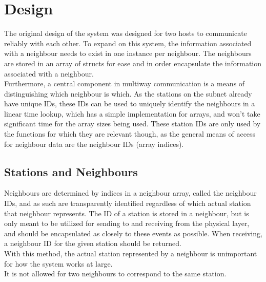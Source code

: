 \section{Design}


The original design of the system was designed for two hosts to communicate reliably with each other. To expand on this system, the information associated with a neighbour needs to exist in one instance per neighbour. The neighbours are stored in an array of structs for ease and in order encapsulate the information associated with a neighbour.\\
Furthermore, a central component in multiway communication is a means of distinguishing which neighbour is which. As the stations on the subnet already have unique IDs, these IDs can be used to uniquely identify the neighbours in a linear time lookup, which has a simple implementation for arrays, and won't take significant time for the array sizes being used. These station IDs are only used by the functions for which they are relevant though, as the general means of access for neighbour data are the neighbour IDs (array indices).

\subsection{Stations and Neighbours}
Neighbours are determined by indices in a neighbour array, called the neighbour IDs, and as such are transparently identified regardless of which actual station that neighbour represents. The ID of a station is stored in a neighbour, but is only meant to be utilized for sending to and receiving from the physical layer, and should be encapsulated as closely to these events as possible. When receiving, a neighbour ID for the given station should be returned.\\
With this method, the actual station represented by a neighbour is unimportant for how the system works at large.\\
It is not allowed for two neighbours to correspond to the same station.

%

